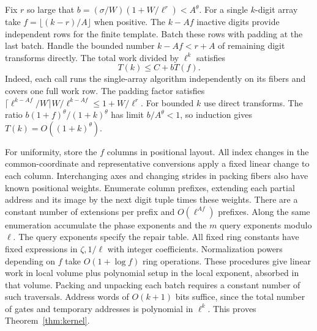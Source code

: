 Fix \(r\) so large that
\(b=(\sigma/W)(1+W/\ell^r)<A^\theta\). For a single \(k\)-digit array
take \(f=\lfloor(k-r)/A\rfloor\) when positive. The \(k-Af\) inactive
digits provide independent rows for the finite template. Batch these
rows with padding at the last batch. Handle the bounded number
\(k-Af<r+A\) of remaining digit transforms directly. The total work
divided by \(\ell^k\) satisfies
\[
                         T(k)\le C+bT(f).
\]
Indeed, each call runs the single-array algorithm independently on
its fibers and covers one full work row. The padding factor satisfies
\(\lceil\ell^{k-Af}/W\rceil W/\ell^{k-Af}\le 1+W/\ell^r\).
For bounded \(k\) use direct transforms. The ratio
\(b(1+f)^\theta/(1+k)^\theta\) has limit \(b/A^\theta<1\), so
induction gives \(T(k)=O((1+k)^\theta)\).

For uniformity, store the \(f\) columns in positional layout.
All index changes in the common-coordinate and representative
conversions apply a fixed linear change to each column. Interchanging
axes and changing strides in packing fibers also have known positional
weights. Enumerate column prefixes, extending each partial address
and its image by the next digit tuple times these weights. There are
a constant number of extensions per prefix and \(O(\ell^{Af})\)
prefixes. Along the same enumeration accumulate the phase exponents
and the \(m\) query exponents modulo \(\ell\). The query exponents
specify the repair table. All fixed ring constants have fixed expressions in
\(\zeta,1/\ell\) with integer coefficients. Normalization powers
depending on \(f\) take \(O(1+\log f)\) ring operations. These
procedures give linear work in local volume plus polynomial setup
in the local exponent, absorbed in that volume. Packing and
unpacking each batch requires a constant number of such traversals.
Address words of \(O(k+1)\) bits suffice, since the total number of
gates and temporary addresses is polynomial in \(\ell^k\). This
proves Theorem~\ref{thm:kernel}.




